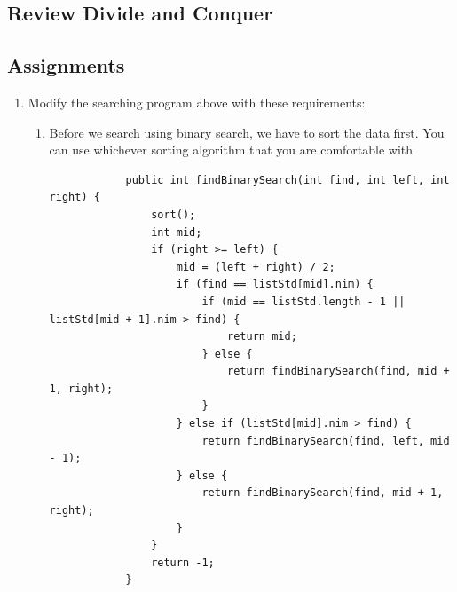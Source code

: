 \documentclass[12pt,titlepage]{article}
\begin{document}
\subsection{Review Divide and Conquer}

\subsection{Assignments}

\begin{enumerate}
    \item Modify the searching program above with these requirements:
    \begin{enumerate}
        \item Before we search using binary search, we have to sort the data first. You can use whichever sorting algorithm that you are comfortable with
        \begin{verbatim}
            public int findBinarySearch(int find, int left, int right) {
                sort();
                int mid;
                if (right >= left) {
                    mid = (left + right) / 2;
                    if (find == listStd[mid].nim) {
                        if (mid == listStd.length - 1 || listStd[mid + 1].nim > find) {
                            return mid;
                        } else {
                            return findBinarySearch(find, mid + 1, right);
                        }
                    } else if (listStd[mid].nim > find) {
                        return findBinarySearch(find, left, mid - 1);
                    } else {
                        return findBinarySearch(find, mid + 1, right);
                    }
                }
                return -1;
            }


\end{verbatim}
\end{enumerate}
\end{enumerate}
\end{document}
